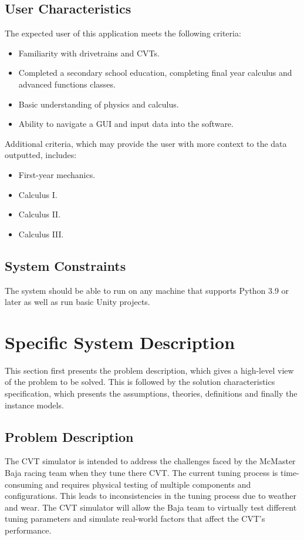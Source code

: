 \documentclass[12pt]{article}
\begin{document}
\subsection{User Characteristics} \label{SecUserCharacteristics}
The expected user of this application meets the following criteria:
\begin{itemize}
  \item Familiarity with drivetrains and CVTs.
  \item Completed a secondary school education, completing final year calculus and advanced functions classes.
  \item Basic understanding of physics and calculus.
  \item Ability to navigate a GUI and input data into the software.
\end{itemize}
Additional criteria, which may provide the user with more context to the data outputted, includes:
\begin{itemize}
  \item First-year mechanics.
  \item Calculus I.
  \item Calculus II.
  \item Calculus III.
\end{itemize}

\subsection{System Constraints}

The system should be able to run on any machine that supports Python 3.9 or later as well as run basic Unity projects.

\section{Specific System Description}

This section first presents the problem description, which gives a high-level
view of the problem to be solved.  This is followed by the solution characteristics
specification, which presents the assumptions, theories, definitions and finally
the instance models. 

\subsection{Problem Description} \label{Sec_pd}

The CVT simulator is intended to address the challenges faced by the McMaster Baja racing team when they tune there CVT.
The current tuning process is time-consuming and requires physical testing of multiple components and configurations. This leads to inconsistencies in the tuning process due to weather and wear.
The CVT simulator will allow the Baja team to virtually test different tuning parameters and simulate real-world factors that affect the CVT's performance.
\end{document}
